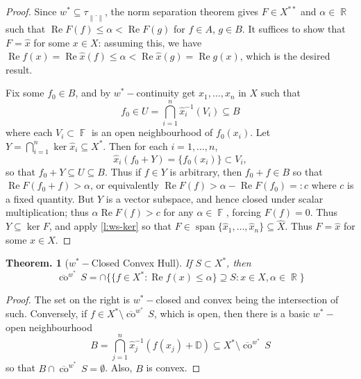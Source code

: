 \documentclass[11pt, a4paper]{memoir}
\DeclareMathOperator{\R}{{\mathbb{R}}}
\DeclareMathOperator{\F}{{\mathbb{F}}}
\newcommand{\norm}[1]{\ensuremath{\left\lVert#1\right\rVert}}
\theoremstyle{change}
\newtheorem{theorem}{Theorem.}[section]
\theoremstyle{plain}
\theoremstyle{nonumberplain}
\newtheorem{proof}{Proof}
\DeclareMathOperator{\spn}{span}
\renewcommand{\Re}{\ensuremath{\operatorname{Re}}}
\newcommand{\cwx}{\ensuremath{\overline{\operatorname{co}}^{w^*}\,}}
\numberwithin{equation}{section}
\begin{document}
\begin{proof}
    Since $w^*\subseteq\tau_{\norm{\cdot}}$, the norm separation theorem gives $F\in X^{**}$ and $\alpha\in\R$ such that $\Re F(f)\leq\alpha<\Re F(g)$ for $f\in A$, $g\in B$.
    It suffices to show that $F=\hat{x}$ for some $x\in X$: assuming this, we have $\Re f(x)=\Re \hat{x}(f)\leq\alpha<\Re \hat{x}(g)=\Re g(x)$, which is the desired result.

    Fix some $f_0\in B$, and by $w^*-$continuity get $x_1,\ldots,x_n$ in $X$ such that
    \begin{equation*}
        f_0\in U=\bigcap_{i=1}^n \hat{x}_i^{-1}(V_i)\subseteq B
    \end{equation*}
    where each $V_i\subset\F$ is an open neighbourhood of $f_0(x_i)$.
    Let $Y=\bigcap_{i=1}^n\ker\hat{x}_i\subseteq X^*$.
    Then for each $i=1,\ldots,n$,
    \begin{equation*}
        \hat x_i(f_0+Y)=\{f_0(x_i)\}\subset V_i,
    \end{equation*}
    so that $f_0+Y\subseteq U\subseteq B$.
    Thus if $f\in Y$ is arbitrary, then $f_0+f\in B$ so that $\Re F(f_0+f)>\alpha$, or equivalently $\Re F(f)>\alpha-\Re F(f_0)=:c$ where $c$ is a fixed quantity.
    But $Y$ is a vector subspace, and hence closed under scalar multiplication; thus $\alpha\Re F(f)>c$ for any $\alpha\in\F$, forcing $F(f)=0$.
    Thus $Y\subseteq\ker F$, and apply \cref{l:ws-ker} so that $F\in\spn\{\hat{x}_1,\ldots,\hat{x}_n\}\subseteq\hat X$.
    Thus $F=\hat{x}$ for some $x\in X$.
\end{proof}
\begin{theorem}[$w^*-$Closed Convex Hull]
    If $S\subset X^*$, then
    \begin{equation*}
        \cwx S=\cap\{\{f\in X^*:\Re f(x)\leq \alpha\}\supseteq S:x\in X,\alpha\in\R\}
    \end{equation*}
\end{theorem}
\begin{proof}
    The set on the right is $w^*-$closed and convex being the intersection of such.
    Conversely, if $f\in X^*\setminus\cwx S$, which is open, then there is a basic $w^*-$open neighbourhood
    \begin{equation*}
        B=\bigcap_{j=1}^n\hat x_j^{-1}(f(x_j)+\mathbb{D})\subseteq X^*\setminus\cwx S
    \end{equation*}
    so that $B\cap\cwx S=\emptyset$.
    Also, $B$ is convex.
\end{proof}
\end{document}
